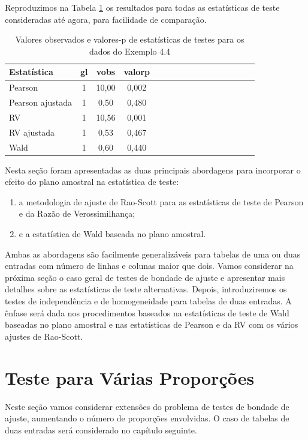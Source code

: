 \documentclass[]{book}
\theoremstyle{definition}
\theoremstyle{definition}
\theoremstyle{definition}
\theoremstyle{remark}
\begin{document}
Reproduzimos na Tabela \ref{tab:testprop} os resultados para todas as
estatísticas de teste consideradas até agora, para facilidade de
comparação.

\begin{table}

\caption{\label{tab:testprop}Valores observados e valores-p de estatísticas de testes para os dados do Exemplo 4.4}
\centering
\begin{tabular}[t]{lccclccclccclccc}
\toprule
Estatística & gl & vobs & valorp\\
\midrule
Pearson & 1 & 10,00 & 0,002\\
Pearson ajustada & 1 & 0,50 & 0,480\\
RV & 1 & 10,56 & 0,001\\
RV ajustada & 1 & 0,53 & 0,467\\
Wald & 1 & 0,60 & 0,440\\
\bottomrule
\end{tabular}
\end{table}

Nesta seção foram apresentadas as duas principais abordagens para
incorporar o efeito do plano amostral na estatística de teste:

\begin{enumerate}
\def\labelenumi{\arabic{enumi}.}
\item
  a metodologia de ajuste de Rao-Scott para as estatísticas de teste de
  Pearson e da Razão de Verossimilhança;
\item
  e a estatística de Wald baseada no plano amostral.
\end{enumerate}

Ambas as abordagens são facilmente generalizáveis para tabelas de uma ou
duas entradas com número de linhas e colunas maior que dois. Vamos
considerar na próxima seção o caso geral de testes de bondade de ajuste
e apresentar mais detalhes sobre as estatísticas de teste alternativas.
Depois, introduziremos os testes de independência e de homogeneidade
para tabelas de duas entradas. A ênfase será dada nos procedimentos
baseados na estatísticas de teste de Wald baseadas no plano amostral e
nas estatísticas de Pearson e da RV com os vários ajustes de Rao-Scott.

\section{Teste para Várias
Proporções}\label{teste-para-varias-proporcoes}

Neste seção vamos considerar extensões do problema de testes de bondade
de ajuste, aumentando o número de proporções envolvidas. O caso de
tabelas de duas entradas será considerado no capítulo seguinte.
\end{document}

